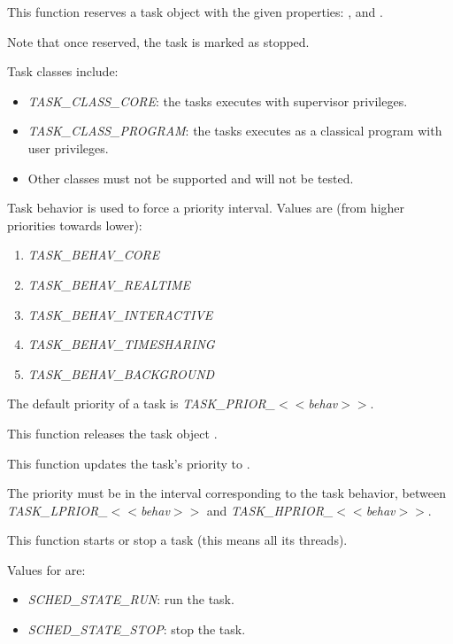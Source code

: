 {
  This function reserves a task object with the given
  properties: ,  and
  .

  Note that once reserved, the task is marked as stopped.

  Task classes include:

  \begin{itemize}
  \item
    \emph{TASK\_CLASS\_CORE}: the tasks executes with
    supervisor privileges.
  \item
    \emph{TASK\_CLASS\_PROGRAM}: the tasks executes as a
    classical program with user privileges.
  \item
    Other classes must not be supported and will not be
    tested.
  \end{itemize}

  Task behavior is used to force a priority interval. Values
  are (from higher priorities towards lower):

  \begin{enumerate}
  \item \emph{TASK\_BEHAV\_CORE}
  \item \emph{TASK\_BEHAV\_REALTIME}
  \item \emph{TASK\_BEHAV\_INTERACTIVE}
  \item \emph{TASK\_BEHAV\_TIMESHARING}
  \item \emph{TASK\_BEHAV\_BACKGROUND}
  \end{enumerate}

  The default priority of a task is
  \emph{TASK\_PRIOR\_$<<$behav$>>$}.
}

\newpage

{
  This function releases the task object .
}

{
  This function updates the task's priority to .

  The priority must be in the interval corresponding to the
  task behavior, between \emph{TASK\_LPRIOR\_$<<$behav$>>$} and
  \emph{TASK\_HPRIOR\_$<<$behav$>>$}.
}

{
  This function starts or stop a task (this means all its
  threads).

  Values for  are:

  \begin{itemize}
  \item
    \emph{SCHED\_STATE\_RUN}: run the task.
  \item
    \emph{SCHED\_STATE\_STOP}: stop the task.
  \end{itemize}
}

